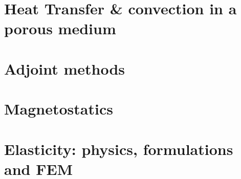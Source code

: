 \documentclass[a4paper]{article}
\numberwithin{equation}{section}
\begin{document}
\newpage
\section{Heat Transfer \& convection in a porous medium} %
 \label{chapt:porous}

\newpage
\section{Adjoint methods} %
 \label{chapt:adjoint}

\newpage
\section{Magnetostatics} %
 \label{chapt:magnetostatics}

\newpage
\section{Elasticity: physics, formulations and FEM } %
 \label{chapt:elasticity}








\end{document}
